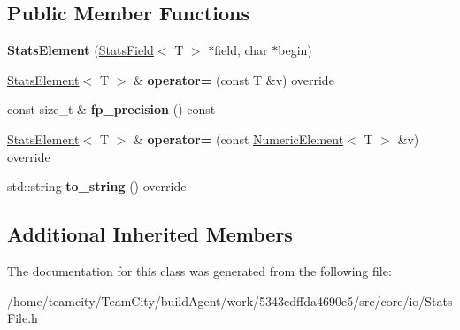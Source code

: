 \subsection*{Public Member Functions}
\begin{DoxyCompactItemize}
\item 
{\bfseries Stats\+Element} (\hyperlink{classStatsField}{Stats\+Field}$<$ T $>$ $\ast$field, char $\ast$begin)\hypertarget{classStatsElement_abdaa33bb94850a172e8fe4937f6a08d0}{}\label{classStatsElement_abdaa33bb94850a172e8fe4937f6a08d0}

\item 
\hyperlink{classStatsElement}{Stats\+Element}$<$ T $>$ \& {\bfseries operator=} (const T \&v) override\hypertarget{classStatsElement_a22260166d05f40a429f23c9b006ca6de}{}\label{classStatsElement_a22260166d05f40a429f23c9b006ca6de}

\item 
const size\+\_\+t \& {\bfseries fp\+\_\+precision} () const \hypertarget{classStatsElement_a514490c4f661e5101a6a7db1128ae6e9}{}\label{classStatsElement_a514490c4f661e5101a6a7db1128ae6e9}

\item 
\hyperlink{classStatsElement}{Stats\+Element}$<$ T $>$ \& {\bfseries operator=} (const \hyperlink{classNumericElement}{Numeric\+Element}$<$ T $>$ \&v) override\hypertarget{classStatsElement_a8c01f70de8ea00a282def4e8ee299a16}{}\label{classStatsElement_a8c01f70de8ea00a282def4e8ee299a16}

\item 
std\+::string {\bfseries to\+\_\+string} () override\hypertarget{classStatsElement_a3d2493d839a018b1397b6621d0e29e3e}{}\label{classStatsElement_a3d2493d839a018b1397b6621d0e29e3e}

\end{DoxyCompactItemize}
\subsection*{Additional Inherited Members}


The documentation for this class was generated from the following file\+:\begin{DoxyCompactItemize}
\item 
/home/teamcity/\+Team\+City/build\+Agent/work/5343cdffda4690e5/src/core/io/Stats\+File.\+h\end{DoxyCompactItemize}
